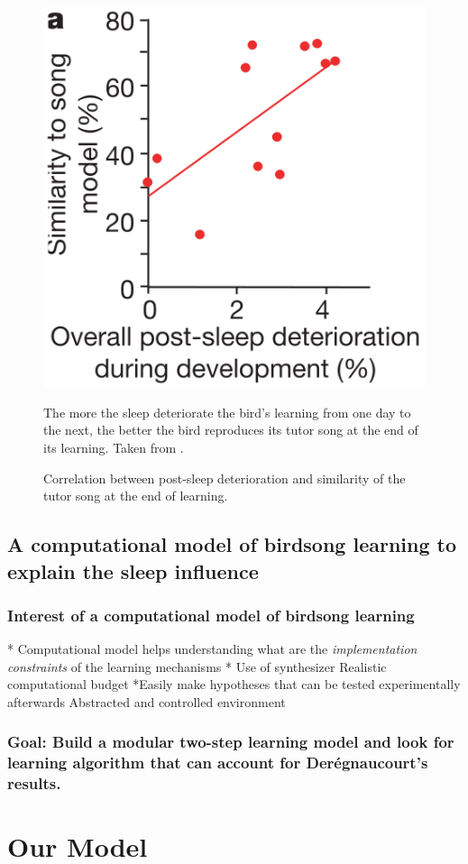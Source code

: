 \documentclass{report}
\begin{document}
\begin{figure}[htpb]
  {\center
  \includegraphics[width=0.3\linewidth]{media/cor_deterioration_sim}
  \caption{Correlation between post-sleep deterioration and similarity of the
  tutor song at the end of learning. \label{der_sim_post_det}}}
  \small
  The more the sleep deteriorate the bird's learning from one day to the next, the better the bird reproduces its tutor song at the end of its learning. Taken from \textcite{deregnaucourt_how_2005}.
\end{figure}


\section{A computational model of birdsong learning to explain the sleep
influence}
\label{a-computational-model-of-birdsong-learning-to-explain-the-sleep-influence}

\subsection{Interest of a computational model of birdsong learning}
\label{interest-of-a-computational-model-of-birdsong-learning}

  * Computational model helps understanding what are the \emph{implementation
  constraints} of the learning mechanisms
  * Use of synthesizer Realistic computational budget
  *Easily make hypotheses that can be tested experimentally afterwards
  Abstracted and controlled environment

\subsection{Goal: Build a modular two-step learning model and look for learning
algorithm that can account for Derégnaucourt's results.}
\label{goal-build-a-modular-two-step-learning-model}

\chapter{Our Model} \label{our-model}
\end{document}
